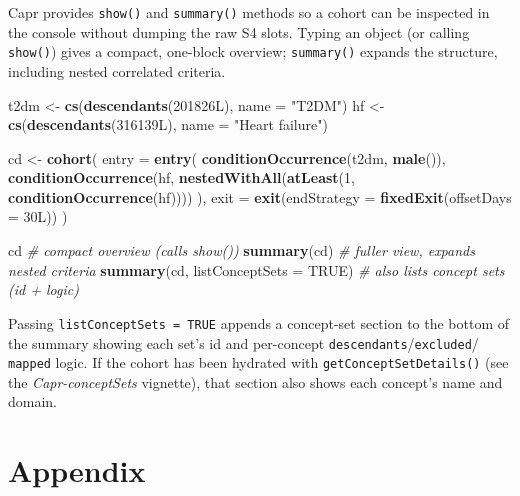 \documentclass[
]{article}
\newenvironment{Shaded}{\begin{snugshade}}{\end{snugshade}}
\newcommand{\AttributeTok}[1]{\textcolor[rgb]{0.13,0.29,0.53}{#1}}
\newcommand{\CommentTok}[1]{\textcolor[rgb]{0.56,0.35,0.01}{\textit{#1}}}
\newcommand{\ConstantTok}[1]{\textcolor[rgb]{0.56,0.35,0.01}{#1}}
\newcommand{\DataTypeTok}[1]{\textcolor[rgb]{0.13,0.29,0.53}{#1}}
\newcommand{\DecValTok}[1]{\textcolor[rgb]{0.00,0.00,0.81}{#1}}
\newcommand{\FunctionTok}[1]{\textcolor[rgb]{0.13,0.29,0.53}{\textbf{#1}}}
\newcommand{\NormalTok}[1]{#1}
\newcommand{\OtherTok}[1]{\textcolor[rgb]{0.56,0.35,0.01}{#1}}
\newcommand{\StringTok}[1]{\textcolor[rgb]{0.31,0.60,0.02}{#1}}
\begin{document}
Capr provides \texttt{show()} and \texttt{summary()} methods so a cohort
can be inspected in the console without dumping the raw S4 slots. Typing
an object (or calling \texttt{show()}) gives a compact, one-block
overview; \texttt{summary()} expands the structure, including nested
correlated criteria.

\begin{Shaded}
\begin{Highlighting}[]
\NormalTok{t2dm }\OtherTok{\textless{}{-}} \FunctionTok{cs}\NormalTok{(}\FunctionTok{descendants}\NormalTok{(}\DecValTok{201826}\DataTypeTok{L}\NormalTok{), }\AttributeTok{name =} \StringTok{"T2DM"}\NormalTok{)}
\NormalTok{hf   }\OtherTok{\textless{}{-}} \FunctionTok{cs}\NormalTok{(}\FunctionTok{descendants}\NormalTok{(}\DecValTok{316139}\DataTypeTok{L}\NormalTok{), }\AttributeTok{name =} \StringTok{"Heart failure"}\NormalTok{)}

\NormalTok{cd }\OtherTok{\textless{}{-}} \FunctionTok{cohort}\NormalTok{(}
  \AttributeTok{entry =} \FunctionTok{entry}\NormalTok{(}
    \FunctionTok{conditionOccurrence}\NormalTok{(t2dm, }\FunctionTok{male}\NormalTok{()),}
    \FunctionTok{conditionOccurrence}\NormalTok{(hf, }\FunctionTok{nestedWithAll}\NormalTok{(}\FunctionTok{atLeast}\NormalTok{(}\DecValTok{1}\NormalTok{, }\FunctionTok{conditionOccurrence}\NormalTok{(hf))))}
\NormalTok{  ),}
  \AttributeTok{exit =} \FunctionTok{exit}\NormalTok{(}\AttributeTok{endStrategy =} \FunctionTok{fixedExit}\NormalTok{(}\AttributeTok{offsetDays =} \DecValTok{30}\DataTypeTok{L}\NormalTok{))}
\NormalTok{)}

\NormalTok{cd                                    }\CommentTok{\# compact overview (calls show())}
\FunctionTok{summary}\NormalTok{(cd)                           }\CommentTok{\# fuller view, expands nested criteria}
\FunctionTok{summary}\NormalTok{(cd, }\AttributeTok{listConceptSets =} \ConstantTok{TRUE}\NormalTok{)   }\CommentTok{\# also lists concept sets (id + logic)}
\end{Highlighting}
\end{Shaded}

Passing \texttt{listConceptSets\ =\ TRUE} appends a concept-set section
to the bottom of the summary showing each set's id and per-concept
\texttt{descendants}/\texttt{excluded}/ \texttt{mapped} logic. If the
cohort has been hydrated with \texttt{getConceptSetDetails()} (see the
\emph{Capr-conceptSets} vignette), that section also shows each
concept's name and domain.

\section{Appendix}\label{appendix}
\end{document}
